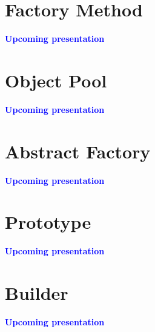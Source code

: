 \documentclass[13pt]{beamer}
\begin{document}
\section{Factory Method}
\begin{frame}
\begin{center}
\textcolor{blue}{\textbf{Upcoming presentation}}
\end{center}
\end{frame}

\section{Object Pool}
\begin{frame}
\begin{center}
\textcolor{blue}{\textbf{Upcoming presentation}}
\end{center}
\end{frame}

\section{Abstract Factory}
\begin{frame}
\begin{center}
\textcolor{blue}{\textbf{Upcoming presentation}}
\end{center}
\end{frame}

\section{Prototype}
\begin{frame}
\begin{center}
\textcolor{blue}{\textbf{Upcoming presentation}}
\end{center}
\end{frame}

\section{Builder}
\begin{frame}
\begin{center}
\textcolor{blue}{\textbf{Upcoming presentation}}
\end{center}
\end{frame}
\end{document}
